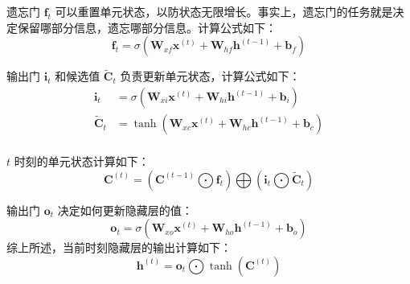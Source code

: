 遗忘门 $\bm{f}_t$ 可以重置单元状态，以防状态无限增长。事实上，遗忘门的任务就是决定保留哪部分信息，遗忘哪部分信息。计算公式如下：
\begin{equation}
    \bm{f}_t=\sigma\left(\bm{W}_{xf}\bm{x}^{(t)}+\bm{W}_{hf}\bm{h}^{(t-1)}+\bm{b}_f\right)
\end{equation}

输出门 $\bm{i}_t$ 和候选值 $\tilde{\bm{C}}_t$ 负责更新单元状态，计算公式如下：
\begin{equation}
    \begin{aligned}
        \bm{i}_t         & =\sigma\left(\bm{W}_{xi}\bm{x}^{(t)}+\bm{W}_{hi}\bm{h}^{(t-1)}+\bm{b}_i\right) \\
        \tilde{\bm{C}}_t & =\tanh\left(\bm{W}_{xc}\bm{x}^{(t)}+\bm{W}_{hc}\bm{h}^{(t-1)}+\bm{b}_c\right)  \\
    \end{aligned}
\end{equation}

$t$ 时刻的单元状态计算如下：
\begin{equation}
    \bm{C}^{(t)}=\left(\bm{C}^{(t-1)}\bigodot\bm{f}_t\right)\bigoplus\left(\bm{i}_t\bigodot\tilde{\bm{C}}_t\right)
\end{equation}

输出门 $\bm{o}_t$ 决定如何更新隐藏层的值：
\begin{equation}
    \bm{o}_t=\sigma\left(\bm{W}_{xo}\bm{x}^{(t)}+\bm{W}_{ho}\bm{h}^{(t-1)}+\bm{b}_o\right)
\end{equation}
综上所述，当前时刻隐藏层的输出计算如下：
\begin{equation}
    \bm{h}^{(t)}=\bm{o}_t\bigodot\tanh\left(\bm{C}^{(t)}\right)
\end{equation}
